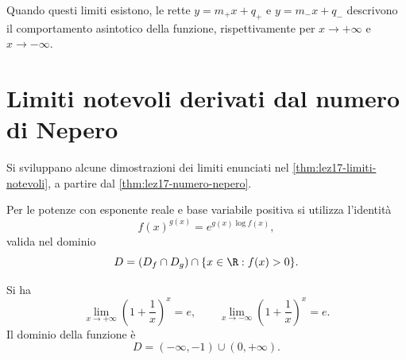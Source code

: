 Quando questi limiti esistono, le rette
\(y=m_+x+q_+\) e \(y=m_-x+q_-\) descrivono
il comportamento asintotico della funzione,
rispettivamente per \(x\to+\infty\) e \(x\to-\infty\).

\clearpage

\section{Limiti notevoli derivati dal numero di Nepero}
\label{sec:lez19-limiti-nepero}

Si sviluppano alcune dimostrazioni dei limiti enunciati
nel \cref{thm:lez17-limiti-notevoli}, a partire dal
\cref{thm:lez17-numero-nepero}.

Per le potenze con esponente reale e base variabile
positiva si utilizza l'identità
\[
  f(x)^{g(x)}=e^{g(x)\log f(x)},
\]
valida nel dominio
\[
  D=(D_f\cap D_g)\cap\{x\in\R:f(x)>0\}.
\]

\begin{proposition}
\label{prop:lez19-nepero-infinito}
Si ha
\[
  \lim_{x\to+\infty}\left(1+\frac1x\right)^x=e,
  \qquad
  \lim_{x\to-\infty}\left(1+\frac1x\right)^x=e.
\]
Il dominio della funzione è
\[
  D=(-\infty,-1)\cup(0,+\infty).
\]
\end{proposition}

